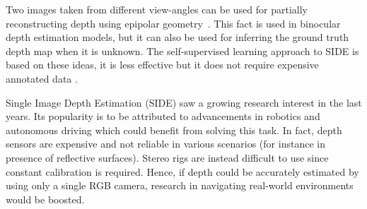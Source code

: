 Two images taken from different view-angles can be used for partially reconstructing depth using epipolar geometry~\cite{multiview}.
This fact is used in binocular depth estimation models, but it can also be used for inferring the ground truth depth map when it is unknown.
The self-supervised learning approach to SIDE is based on these ideas, it is less effective but it does not require expensive annotated data \cite{SfMLearner}.
%
%
%

Single Image Depth Estimation (SIDE) saw a growing research interest in the last years.
Its popularity is to be attributed to advancements in robotics and autonomous driving which could benefit from solving this task.
In fact, depth sensors are expensive and not reliable in various scenarios (for instance in presence of reflective surfaces).
Stereo rigs are instead difficult to use since constant calibration is required.
Hence, if depth could be accurately estimated by using only a single RGB camera, research in navigating real-world environments would be boosted.

